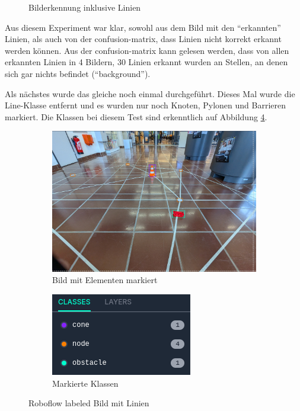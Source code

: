 \begin{figure}[H]
\caption{Bilderkennung inklusive Linien}
\label{fig:recognition-with-lines}
\end{figure}

Aus diesem Experiment war klar, sowohl aus dem Bild mit den ``erkannten'' Linien, als auch von der \gls{confusion-matrix}, dass Linien nicht korrekt erkannt werden können.
Aus der \gls{confusion-matrix} kann gelesen werden, dass von allen erkannten Linien in 4 Bildern, 30 Linien erkannt wurden an Stellen, an denen sich gar nichts befindet (``background'').

Als nächstes wurde das gleiche noch einmal durchgeführt. Dieses Mal wurde die Line-Klasse entfernt und es wurden nur noch Knoten, Pylonen und Barrieren markiert. Die Klassen bei diesem Test sind erkenntlich auf Abbildung \ref{fig:labeled-with-lines}.

\begin{figure}[H]
\centering
\begin{subfigure}{0.55\textwidth}
\centering
\includegraphics[width=0.95\linewidth]{assets/informatik-prototyp/yolo/labeled-image.png} 
\caption{Bild mit Elementen markiert}
\label{fig:labeled-image}
\end{subfigure}
\begin{subfigure}{0.4\textwidth}
\centering
\includegraphics[width=0.95\linewidth]{assets/informatik-prototyp/yolo/labeled-classes.png} 
\caption{Markierte Klassen}
\label{fig:line-classes}
\end{subfigure}

\caption{Roboflow labeled Bild mit Linien}
\label{fig:labeled-with-lines}
\end{figure}

